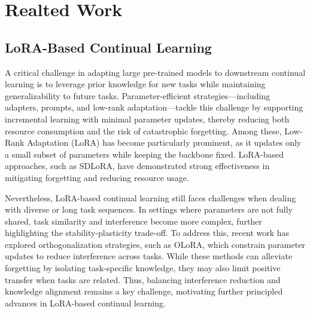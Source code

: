 \documentclass[letterpaper]{article} %
\begin{document}
\section{Realted Work}

\subsection{LoRA-Based Continual Learning}

A critical challenge in adapting large pre-trained models to downstream continual learning is to leverage prior knowledge for new tasks while maintaining generalizability to future tasks. Parameter-efficient strategies—including adapters, prompts, and low-rank adaptation—tackle this challenge by supporting incremental learning with minimal parameter updates, thereby reducing both resource consumption and the risk of catastrophic forgetting. Among these, Low-Rank Adaptation (LoRA) has become particularly prominent, as it updates only a small subset of parameters while keeping the backbone fixed. LoRA-based approaches, such as SDLoRA, have demonstrated strong effectiveness in mitigating forgetting and reducing resource usage.

Nevertheless, LoRA-based continual learning still faces challenges when dealing with diverse or long task sequences. In settings where parameters are not fully shared, task similarity and interference become more complex, further highlighting the stability-plasticity trade-off. To address this, recent work has explored orthogonalization strategies, such as OLoRA, which constrain parameter updates to reduce interference across tasks. While these methods can alleviate forgetting by isolating task-specific knowledge, they may also limit positive transfer when tasks are related. Thus, balancing interference reduction and knowledge alignment remains a key challenge, motivating further principled advances in LoRA-based continual learning.



\end{document}
